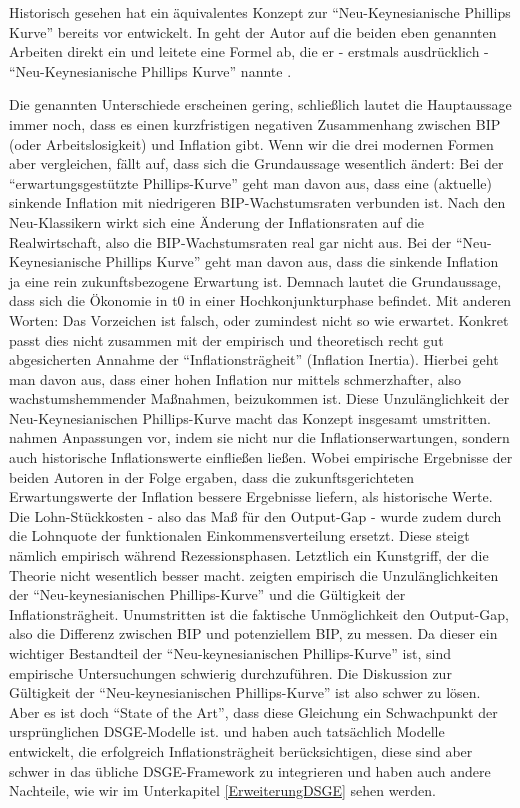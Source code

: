 Historisch gesehen hat \textcite{Rotemberg1982} ein äquivalentes Konzept zur "`Neu-Keynesianische Phillips Kurve"' bereits vor \textcite{Calvo1983} entwickelt. In \textcite{Roberts1995} geht der Autor auf die beiden eben genannten Arbeiten direkt ein und leitete eine Formel ab, die er - erstmals ausdrücklich - "`Neu-Keynesianische Phillips Kurve"' nannte \parencite[S. 979]{Roberts1995}. 

Die genannten Unterschiede erscheinen gering, schließlich lautet die Hauptaussage immer noch, dass es einen kurzfristigen negativen Zusammenhang zwischen BIP (oder Arbeitslosigkeit) und Inflation gibt. Wenn wir die drei modernen Formen aber vergleichen, fällt auf, dass sich die Grundaussage wesentlich ändert: Bei der "`erwartungsgestützte Phillips-Kurve"' geht man davon aus, dass eine (aktuelle) sinkende Inflation mit niedrigeren BIP-Wachstumsraten verbunden ist. Nach den Neu-Klassikern wirkt sich eine Änderung der Inflationsraten auf die Realwirtschaft, also die BIP-Wachstumsraten real gar nicht aus. Bei der "`Neu-Keynesianische Phillips Kurve"' geht man davon aus, dass die sinkende Inflation ja eine rein zukunftsbezogene Erwartung ist. Demnach lautet die Grundaussage, dass sich die Ökonomie in t0 in einer Hochkonjunkturphase befindet. Mit anderen Worten: Das Vorzeichen ist falsch, oder zumindest nicht so wie erwartet. Konkret passt dies nicht zusammen mit der empirisch und theoretisch recht gut abgesicherten Annahme der "`Inflationsträgheit"' (Inflation Inertia). Hierbei geht man davon aus, dass einer hohen Inflation nur mittels schmerzhafter, also wachstumshemmender Maßnahmen, beizukommen ist.
Diese Unzulänglichkeit der Neu-Keynesianischen Phillips-Kurve macht das Konzept insgesamt umstritten. \textcite{Gali1999} nahmen Anpassungen vor, indem sie nicht nur die Inflationserwartungen, sondern auch historische Inflationswerte einfließen ließen. Wobei empirische Ergebnisse der beiden Autoren in der Folge ergaben, dass die zukunftsgerichteten Erwartungswerte der Inflation bessere Ergebnisse liefern, als historische Werte. Die Lohn-Stückkosten - also das Maß für den Output-Gap - wurde zudem durch die Lohnquote der funktionalen Einkommensverteilung ersetzt. Diese steigt nämlich empirisch während Rezessionsphasen. Letztlich ein Kunstgriff, der die Theorie nicht wesentlich besser macht. \textcite{Rudd2005, Rudd2006} zeigten empirisch die Unzulänglichkeiten der "`Neu-keynesianischen Phillips-Kurve"' und die Gültigkeit der Inflationsträgheit. Unumstritten ist die faktische Unmöglichkeit den Output-Gap, also die Differenz zwischen BIP und potenziellem BIP, zu messen. Da dieser ein wichtiger Bestandteil der "`Neu-keynesianischen Phillips-Kurve"' ist, sind empirische Untersuchungen schwierig durchzuführen. Die Diskussion zur Gültigkeit der "`Neu-keynesianischen Phillips-Kurve"' ist also schwer zu lösen. Aber es ist doch "`State of the Art"', dass diese Gleichung ein Schwachpunkt der ursprünglichen DSGE-Modelle ist. \textcite{Mankiw2002} und \textcite{Christiano2005} haben auch tatsächlich Modelle entwickelt, die erfolgreich Inflationsträgheit berücksichtigen, diese sind aber schwer in das übliche DSGE-Framework zu integrieren und haben auch andere Nachteile, wie wir im Unterkapitel \ref{ErweiterungDSGE} sehen werden. 

